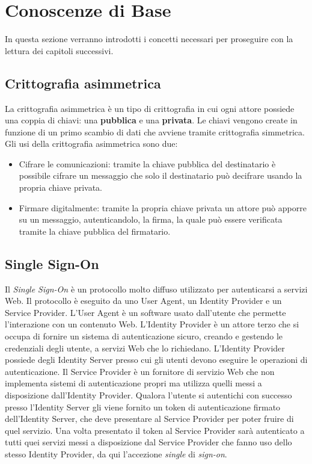 \chapter{Conoscenze di Base}
\label{conoscenze}

In questa sezione verranno introdotti i concetti necessari per proseguire con la lettura dei capitoli successivi. 

\section{Crittografia asimmetrica}
\label{asimmetrica}

La crittografia asimmetrica è un tipo di crittografia in cui ogni attore possiede una coppia di chiavi: una \textbf{pubblica} e una \textbf{privata}. Le chiavi vengono create in funzione di un primo scambio di dati che avviene tramite crittografia simmetrica. Gli usi della crittografia asimmetrica sono due:
\begin{itemize}
	\item Cifrare le comunicazioni: tramite la chiave pubblica del destinatario è possibile cifrare un messaggio che solo il destinatario può decifrare usando la propria chiave privata.
	\item Firmare digitalmente: tramite la propria chiave privata un attore può apporre su un messaggio, autenticandolo, la firma, la quale può essere verificata tramite la chiave pubblica del firmatario.
\end{itemize}

\section{Single Sign-On}
\label{sso}


Il \emph{Single Sign-On} è un protocollo molto diffuso utilizzato per autenticarsi a servizi Web. Il protocollo è eseguito da uno User Agent, un Identity Provider e un Service Provider. L'User Agent è un software usato dall'utente che permette l'interazione con un contenuto Web. L'Identity Provider è un attore terzo che si occupa di fornire un sistema di autenticazione sicuro, creando e gestendo le credenziali degli utente, a servizi Web che lo richiedano. L'Identity Provider possiede degli Identity Server presso cui gli utenti devono eseguire le operazioni di autenticazione. Il Service Provider è un fornitore di servizio Web che non implementa sistemi di autenticazione propri ma utilizza quelli messi a disposizione dall'Identity Provider. Qualora l'utente si autentichi con successo presso l'Identity Server gli viene fornito un token di autenticazione firmato dell'Identity Server, che deve presentare al Service Provider per poter fruire di quel servizio.  Una volta presentato il token al Service Provider sarà autenticato a tutti quei servizi messi a disposizione dal Service Provider che fanno uso dello stesso Identity Provider, da qui l'accezione \emph{single} di \emph{sign-on}.

